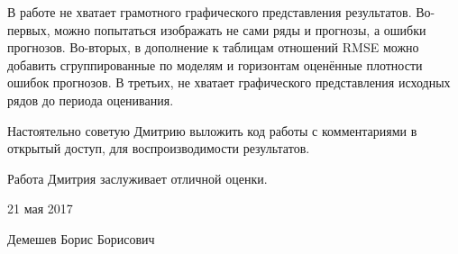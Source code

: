 \documentclass[a4paper, 12pt]{article}
\begin{document}
В работе не хватает грамотного графического представления результатов.
Во-первых, можно попытаться изображать не сами ряды и прогнозы, а ошибки
прогнозов. Во-вторых, в дополнение к таблицам отношений RMSE можно
добавить сгруппированные по моделям и горизонтам оценённые плотности
ошибок прогнозов. В третьих, не хватает графического представления
исходных рядов до периода оценивания.

Настоятельно советую Дмитрию выложить код работы с комментариями в
открытый доступ, для воспроизводимости результатов.

Работа Дмитрия заслуживает отличной оценки.

\vspace{0.4cm}

21 мая 2017

Демешев Борис Борисович
\end{document}
